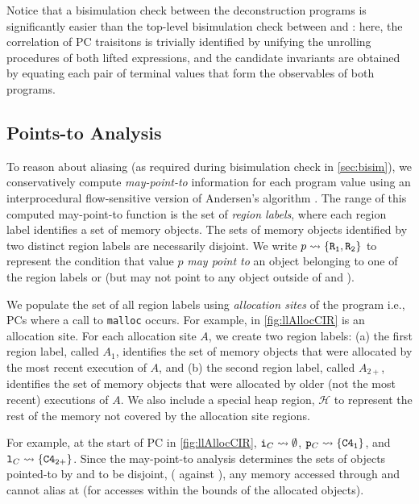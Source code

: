 Notice that a bisimulation check between the deconstruction programs is
significantly easier than the top-level bisimulation check between \sprog{} and \cprog{}:
here, the correlation of PC traisitons is trivially identified by unifying the
unrolling procedures of both lifted expressions, and the candidate invariants
are obtained by equating each pair of terminal values that form the observables
of both programs.

\subsection{Points-to Analysis}
\label{sec:pointsTo}
To reason about aliasing (as required during bisimulation check in \cref{sec:bisim}),
we conservatively compute {\em may-point-to} information for each program value using
an interprocedural flow-sensitive version of Andersen's algorithm \cite{andersen94programanalysis}.
The range of this computed may-point-to function is the set of {\em region labels},
where each region label identifies a set of memory objects.
The sets of memory objects identified by two distinct region labels
are necessarily disjoint.
We write $p \rightsquigarrow{} \{ {\tt R_1}, {\tt R_2} \}$ to represent the condition that value $p$
{\em may point to} an object belonging to one of the region labels  or 
(but may not point to any object outside of  and ).

We populate the set of all region labels using {\em allocation sites} of the \cprog{} program
i.e., PCs where a call to {\tt malloc} occurs.
For example,  in \cref{fig:llAllocCIR} is an allocation site.
For each allocation site $A$, we create two region labels:
(a) the first region label, called $A_1$, identifies the set of memory objects
that were allocated by the most recent execution of $A$, and (b) the second region
label, called $A_{2+}$, identifies the set of memory objects that were allocated
by older (not the most recent) executions of $A$.
We also include a special heap region, $\mathcal{H}$ to represent
the rest of the memory not covered by the allocation site regions.

For example, at the start of PC  in \cref{fig:llAllocCIR},
${\tt i}_{C} \rightsquigarrow{} \emptyset$, ${\tt p}_{C} \rightsquigarrow{} \{ {\tt {\tt C4}_1} \}$,
and ${\tt l}_{C} \rightsquigarrow{} \{ {\tt {\tt C4}_{2+}} \}$.
Since the may-point-to analysis determines the sets of objects pointed-to
by  and  to be disjoint, ( against ),
any memory accessed through  and  cannot alias at 
(for accesses within the bounds of the allocated objects).

